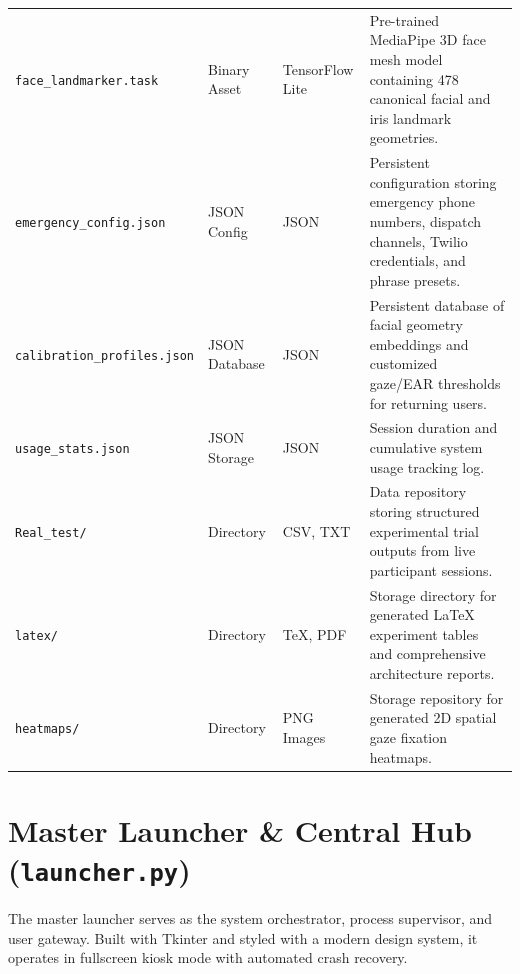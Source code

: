 \documentclass[11pt,a4paper]{article}
\begin{document}
\begin{table}[H]
\begin{tabularx}{\textwidth}{p{} p{} p{} X}
\texttt{face\_landmarker.task}& Binary Asset & TensorFlow Lite & Pre-trained MediaPipe 3D face mesh model containing 478 canonical facial and iris landmark geometries. \\
\texttt{emergency\_config.json}& JSON Config & JSON & Persistent configuration storing emergency phone numbers, dispatch channels, Twilio credentials, and phrase presets. \\
\texttt{calibration\_profiles.json} & JSON Database & JSON & Persistent database of facial geometry embeddings and customized gaze/EAR thresholds for returning users. \\
\texttt{usage\_stats.json} & JSON Storage & JSON & Session duration and cumulative system usage tracking log. \\
\texttt{Real\_test/} & Directory & CSV, TXT & Data repository storing structured experimental trial outputs from live participant sessions. \\
\texttt{latex/} & Directory & TeX, PDF & Storage directory for generated LaTeX experiment tables and comprehensive architecture reports. \\
\texttt{heatmaps/} & Directory & PNG Images & Storage repository for generated 2D spatial gaze fixation heatmaps. \\
\bottomrule
\end{tabularx}
\end{table}

\section{Master Launcher \& Central Hub (\texttt{launcher.py})}

The master launcher serves as the system orchestrator, process supervisor, and user gateway. Built with Tkinter and styled with a modern design system, it operates in fullscreen kiosk mode with automated crash recovery.
\end{document}
